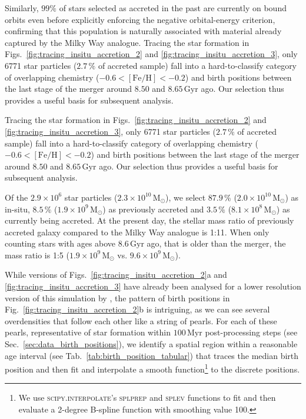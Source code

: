\documentclass[fleqn,usenatbib]{mnras}
\newcommand{\changed}[1]{{{#1}}}
\begin{document}
Similarly, $99\%$ of stars selected as accreted in the past are currently on bound orbits \changed{even before explicitly enforcing the negative orbital-energy criterion, confirming that this population is naturally associated with material already captured by the Milky Way analogue.} Tracing the star formation in Figs.~\ref{fig:tracing_insitu_accretion_2} and \ref{fig:tracing_insitu_accretion_3}, only 6771 star particles ($2.7\,\%$ of accreted sample) fall into a hard-to-classify category of overlapping chemistry ($-0.6 < \mathrm{[Fe/H]} < -0.2$) and birth positions between the last stage of the merger around $8.50$ and $8.65\,\mathrm{Gyr}$ ago. Our selection thus provides a useful basis for subsequent analysis.

Tracing the star formation in Figs.~\ref{fig:tracing_insitu_accretion_2} and \ref{fig:tracing_insitu_accretion_3}, only 6771 star particles ($2.7\,\%$ of accreted sample) fall into a hard-to-classify category of overlapping chemistry ($-0.6 < \mathrm{[Fe/H]} < -0.2$) and birth positions between the last stage of the merger around $8.50$ and $8.65\,\mathrm{Gyr}$ ago. Our selection thus provides a useful basis for subsequent analysis.

Of the $2.9 \times 10^6$ star particles ($2.3 \times 10^{10}\,\mathrm{M_\odot}$), we select $87.9\,\mathrm{\%}$ ($2.0 \times 10^{10}\,\mathrm{M_\odot}$) as in-situ, $8.5\,\mathrm{\%}$ ($1.9 \times 10^{9}\,\mathrm{M_\odot}$) as previously accreted and $3.5\,\mathrm{\%}$ ($8.1 \times 10^{8}\,\mathrm{M_\odot}$) as currently being accreted. At \changed{the present day,} the stellar mass ratio of previously accreted galaxy compared to the Milky Way analogue is 1:11. When only counting stars with ages above $8.6\,\mathrm{Gyr}$ ago, that is older than the merger, the mass ratio is 1:5 ($1.9 \times 10^{9}\,\mathrm{M_\odot}$ vs. $9.6 \times 10^{9}\,\mathrm{M_\odot}$).

While versions of Figs.~\ref{fig:tracing_insitu_accretion_2}a and \ref{fig:tracing_insitu_accretion_3} have already been analysed for a lower resolution version of this simulation by \citet{Buder2024}, the pattern of birth positions in Fig.~\ref{fig:tracing_insitu_accretion_2}b is intriguing, as we can see several overdensities that follow each other like a string of pearls.
For each of these pearls, representative of star formation within $100\,\mathrm{Myr}$ post-processing steps (see Sec.~\ref{sec:data_birth_positions}), we identify a spatial region within a reasonable age interval (see Tab.~\ref{tab:birth_position_tabular}) that traces the median birth position and then fit and interpolate a smooth function\footnote{We use \textsc{scipy.interpolate}'s \textsc{splprep} and \textsc{splev} functions \citep{Scipy} to fit and then evaluate a 2-degree B-spline function with smoothing value 100.} to the discrete positions.  
\end{document}
